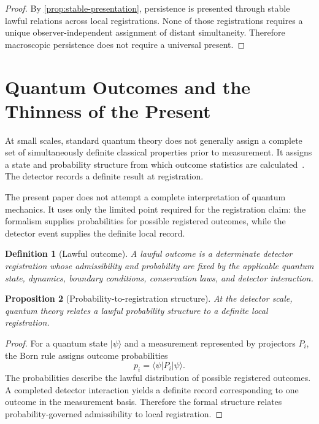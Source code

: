 \documentclass[12pt,onecolumn]{article}
\newtheorem{proposition}{Proposition}[section]
\newtheorem{definition}[proposition]{Definition}
\begin{document}
\begin{proof}
By \cref{prop:stable-presentation}, persistence is presented through stable lawful relations across local registrations. None of those registrations requires a unique observer-independent assignment of distant simultaneity. Therefore macroscopic persistence does not require a universal present.
\end{proof}

\section{Quantum Outcomes and the Thinness of the Present}

At small scales, standard quantum theory does not generally assign a complete set of simultaneously definite classical properties prior to measurement. It assigns a state and probability structure from which outcome statistics are calculated~\cite{Dirac1958,Sakurai2017}. The detector records a definite result at registration.

The present paper does not attempt a complete interpretation of quantum mechanics. It uses only the limited point required for the registration claim: the formalism supplies probabilities for possible registered outcomes, while the detector event supplies the definite local record.

\begin{definition}[Lawful outcome]
\label{def:lawful-outcome}
A lawful outcome is a determinate detector registration whose admissibility and probability are fixed by the applicable quantum state, dynamics, boundary conditions, conservation laws, and detector interaction.
\end{definition}

\begin{proposition}[Probability-to-registration structure]
\label{prop:probability-registration}
At the detector scale, quantum theory relates a lawful probability structure to a definite local registration.
\end{proposition}

\begin{proof}
For a quantum state \(\lvert\psi\rangle\) and a measurement represented by projectors \(P_i\), the Born rule assigns outcome probabilities
\begin{equation}
p_i=\langle\psi|P_i|\psi\rangle.
\end{equation}
The probabilities describe the lawful distribution of possible registered outcomes. A completed detector interaction yields a definite record corresponding to one outcome in the measurement basis. Therefore the formal structure relates probability-governed admissibility to local registration.
\end{proof}
\end{document}
